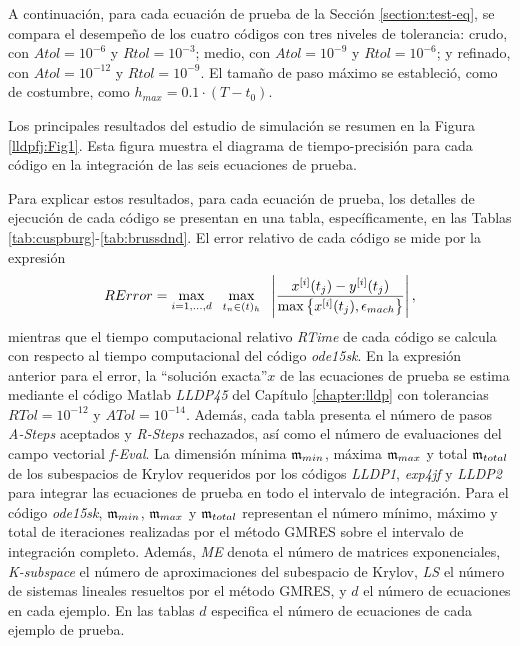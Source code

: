 A continuación, para cada ecuación de prueba de la Sección \ref{section:test-eq}, se compara el desempeño de los cuatro códigos con tres niveles de tolerancia: crudo, con $ Atol = 10^{-6}$ y $Rtol = 10^{-3}$; medio, con $Atol = 10^{-9}$ y $Rtol = 10^{-6}$; y refinado, con $ Atol = 10^{-12}$ y $Rtol = 10^{-9}$. El tamaño de paso máximo se estableció, como de costumbre, como $h_{max}=0\mathord{.}1\cdot(T-t_0)$.

Los principales resultados del estudio de simulación se resumen en la Figura \ref{lldpfj:Fig1}. Esta figura muestra el diagrama de tiempo-precisión para cada código en la integración de las seis ecuaciones de prueba.

Para explicar estos resultados, para cada ecuación de prueba, los detalles de ejecución de cada código se presentan en una tabla, específicamente, en las Tablas \ref{tab:cuspburg}-\ref{tab:brussdnd}. El error relativo de cada código se mide por la expresión
\begin{equation*}
	RError = \max_{i=1,\ldots,d} \;\ \max_{t_n\in(t)_h}  \;\ \left\lvert\frac{x^{[i]}(t_j)-y^{[i]}(t_j)}{\maxx{x^{[i]}(t_j),\epsilon_{mach}}}\right\rvert,
\end{equation*}
mientras que el tiempo computacional relativo \textit{RTime} de cada código se calcula con respecto al tiempo computacional del código \emph{ode15sk}. En la expresión anterior para el error, la \textquotedblleft solución exacta\textquotedblright \;$x$ de las ecuaciones de prueba se estima mediante el código Matlab \emph{LLDP45} del Capítulo \ref{chapter:lldp} con tolerancias $RTol=10^{-12}$ y $ATol=10^{-14}$. Además, cada tabla presenta el número de pasos \textit{A-Steps} aceptados y \textit{R-Steps} rechazados, así como el número de evaluaciones del campo vectorial \textit{f-Eval}. La dimensión mínima $\mathfrak{m}_ {min}$, máxima $\mathfrak{m}_ {max}$ y total $\mathfrak{m}_{total}$ de los subespacios de Krylov requeridos por los códigos \emph{LLDP1}, \emph{exp4jf} y \emph{LLDP2} para integrar las ecuaciones de prueba en todo el intervalo de integración. Para el código \emph{ode15sk}, $\mathfrak{m}_{min}$, $\mathfrak{m}_{max}$ y $\mathfrak{m}_{total}$ representan el número mínimo, máximo y total de iteraciones realizadas por el método GMRES sobre el intervalo de integración completo. Además, \textit{ME} denota el número de matrices exponenciales, \textit{K-subspace} el número de aproximaciones del subespacio de Krylov, \textit{LS} el número de sistemas lineales resueltos por el método GMRES, y $d$ el número de ecuaciones en cada ejemplo. En las tablas $d$ especifica el número de ecuaciones de cada ejemplo de prueba.

